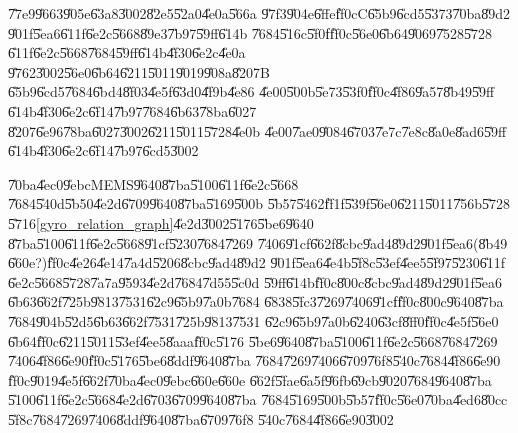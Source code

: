 \U{77e9}\U{9663}\U{905e}\U{63a8}\U{3002}\U{82e5}\U{52a0}\U{4e0a}\U{566a}%
\U{97f3}\U{904e}\U{6ffe}\U{ff0c}C\U{65b9}\U{6cd5}\U{5373}\U{70ba}\U{89d2}%
\U{901f}\U{5ea6}\U{611f}\U{6e2c}\U{5668}\U{89e3}\U{7b97}\U{59ff}\U{614b}%
\U{7684}\U{516c}\U{5f0f}\U{ff0c}\U{56e0}\U{6b64}\U{9069}\U{7528}\U{5728}%
\U{611f}\U{6e2c}\U{5668}\U{7684}\U{59ff}\U{614b}\U{4f30}\U{6e2c}\U{4e0a}%
\U{9762}\U{3002}\U{56e0}\U{6b64}\U{6211}\U{5011}\U{9019}\U{908a}\U{8207}B%
\U{65b9}\U{6cd5}\U{7684}\U{6bd4}\U{8f03}\U{4e5f}\U{63d0}\U{4f9b}\U{4e86}%
\U{4e00}\U{500b}\U{5e73}\U{53f0}\U{ff0c}\U{4f86}\U{9a57}\U{8b49}\U{59ff}%
\U{614b}\U{4f30}\U{6e2c}\U{6f14}\U{7b97}\U{7684}\U{6b63}\U{78ba}\U{6027}%
\U{8207}\U{6e96}\U{78ba}\U{6027}\U{3002}\U{6211}\U{5011}\U{5728}\U{4e0b}%
\U{4e00}\U{7ae0}\U{9084}\U{6703}\U{7e7c}\U{7e8c}\U{8a0e}\U{8ad6}\U{59ff}%
\U{614b}\U{4f30}\U{6e2c}\U{6f14}\U{7b97}\U{6cd5}\U{3002}

\bigskip

\U{70ba}\U{4ec0}\U{9ebc}MEMS\U{9640}\U{87ba}\U{5100}\U{611f}\U{6e2c}\U{5668}%
\U{7684}\U{540d}\U{5b50}\U{4e2d}\U{6709}\U{9640}\U{87ba}\U{5169}\U{500b}%
\U{5b57}\U{5462}\U{ff1f}\U{539f}\U{56e0}\U{6211}\U{5011}\U{756b}\U{5728}%
\U{5716}\ref{gyro_relation_graph}\U{4e2d}\U{3002}\U{5176}\U{5be6}\U{9640}%
\U{87ba}\U{5100}\U{611f}\U{6e2c}\U{5668}\U{91cf}\U{5230}\U{7684}\U{7269}%
\U{7406}\U{91cf}\U{662f}\U{8cbc}\U{9ad4}\U{89d2}\U{901f}\U{5ea6}(\U{8b49}%
\U{660e}?)\U{ff0c}\U{4e26}\U{4e14}\U{7a4d}\U{5206}\U{8cbc}\U{9ad4}\U{89d2}%
\U{901f}\U{5ea6}\U{4e4b}\U{5f8c}\U{53ef}\U{4ee5}\U{5f97}\U{5230}\U{611f}%
\U{6e2c}\U{5668}\U{5728}\U{7a7a}\U{9593}\U{4e2d}\U{7684}\U{7d55}\U{5c0d}%
\U{59ff}\U{614b}\U{ff0c}\U{800c}\U{8cbc}\U{9ad4}\U{89d2}\U{901f}\U{5ea6}%
\U{6b63}\U{662f}\U{725b}\U{9813}\U{7531}\U{62c9}\U{65b9}\U{7a0b}\U{7684}%
\U{6838}\U{5fc3}\U{7269}\U{7406}\U{91cf}\U{ff0c}\U{800c}\U{9640}\U{87ba}%
\U{7684}\U{904b}\U{52d5}\U{6b63}\U{662f}\U{7531}\U{725b}\U{9813}\U{7531}%
\U{62c9}\U{65b9}\U{7a0b}\U{6240}\U{63cf}\U{8ff0}\U{ff0c}\U{4e5f}\U{56e0}%
\U{6b64}\U{ff0c}\U{6211}\U{5011}\U{53ef}\U{4ee5}\U{8aaa}\U{ff0c}\U{5176}%
\U{5be6}\U{9640}\U{87ba}\U{5100}\U{611f}\U{6e2c}\U{5668}\U{7684}\U{7269}%
\U{7406}\U{4f86}\U{6e90}\U{ff0c}\U{5176}\U{5be6}\U{8ddf}\U{9640}\U{87ba}%
\U{7684}\U{7269}\U{7406}\U{6709}\U{76f8}\U{540c}\U{7684}\U{4f86}\U{6e90}%
\U{ff0c}\U{9019}\U{4e5f}\U{662f}\U{70ba}\U{4ec0}\U{9ebc}\U{660e}\U{660e}%
\U{662f}\U{5fae}\U{6a5f}\U{96fb}\U{69cb}\U{9020}\U{7684}\U{9640}\U{87ba}%
\U{5100}\U{611f}\U{6e2c}\U{5668}\U{4e2d}\U{6703}\U{6709}\U{9640}\U{87ba}%
\U{7684}\U{5169}\U{500b}\U{5b57}\U{ff0c}\U{56e0}\U{70ba}\U{4ed6}\U{80cc}%
\U{5f8c}\U{7684}\U{7269}\U{7406}\U{8ddf}\U{9640}\U{87ba}\U{6709}\U{76f8}%
\U{540c}\U{7684}\U{4f86}\U{6e90}\U{3002}

